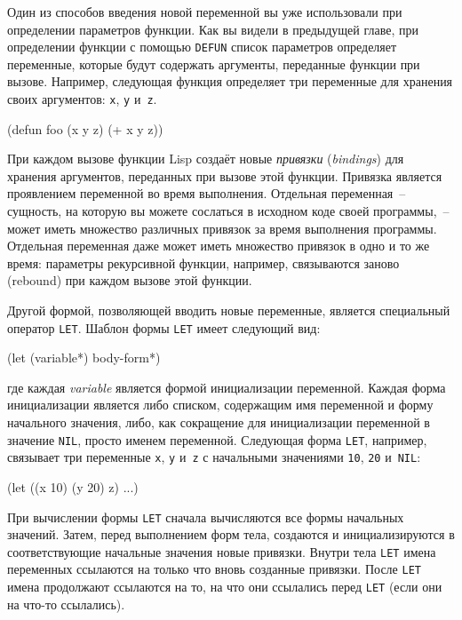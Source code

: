 Один из способов введения новой переменной вы уже использовали при определении параметров
функции. Как вы видели в предыдущей главе, при определении функции с помощью
\lstinline{DEFUN} список параметров определяет переменные, которые будут содержать аргументы,
переданные функции при вызове. Например, следующая функция определяет три переменные для
хранения своих аргументов: \lstinline{x}, \lstinline{y} и~\lstinline{z}.

\begin{myverb}
(defun foo (x y z) (+ x y z))
\end{myverb}

При каждом вызове функции Lisp создаёт новые \textit{привязки} (\textit{bindings}) для
хранения аргументов, переданных при вызове этой функции. Привязка является проявлением
переменной во время выполнения. Отдельная переменная~-- сущность, на которую вы можете
сослаться в исходном коде своей программы,~-- может иметь множество различных привязок за
время выполнения программы. Отдельная переменная даже может иметь множество привязок в
одно и то же время: параметры рекурсивной функции, например, связываются заново (rebound)
при каждом вызове этой функции.

Другой формой, позволяющей вводить новые переменные, является специальный оператор
\lstinline{LET}. Шаблон формы \lstinline{LET} имеет следующий вид:

\begin{myverb}
(let (variable*) body-form*)
\end{myverb}

\noindent{}где каждая \textit{variable} является формой инициализации переменной. Каждая
форма инициализации является либо списком, содержащим имя переменной и форму начального
значения, либо, как сокращение для инициализации переменной в значение \lstinline{NIL},
прос\-то именем переменной. Следующая форма \lstinline{LET}, например, связывает три
переменные \lstinline{x}, \lstinline{y} и~\lstinline{z} с начальными значениями
\lstinline{10}, \lstinline{20} и~\lstinline{NIL}:

\begin{myverb}
(let ((x 10) (y 20) z)
  ...)
\end{myverb}

При вычислении формы \lstinline{LET} сначала вычисляются все формы начальных значений. Затем,
перед выполнением форм тела, создаются и инициализируются в соответствующие начальные
значения новые привязки. Внутри тела \lstinline{LET} имена переменных ссылаются на только что
вновь созданные привязки. После \lstinline{LET} имена продолжают ссылаются на то, на что они
ссылались перед \lstinline{LET} (если они на что-то ссылались).

